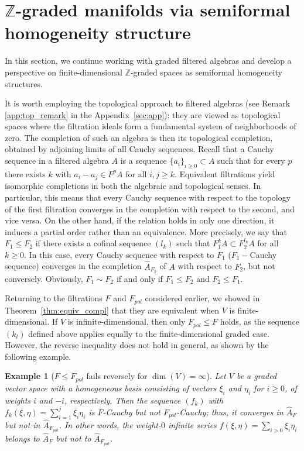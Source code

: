 \documentclass[a4paper,12pt]{amsart}
\newtheorem{example}{Example}
\newcommand{\Z}{{\mathbb Z}}
\begin{document}
\section{$\Z$-graded manifolds via semiformal homogeneity structure}\label{sec:formal_homogeneity}


\noindent In this section, we continue working with graded filtered algebras and develop a perspective on finite-dimensional $\Z$-graded spaces as semiformal homogeneity structures.

\smallskip

\noindent It is worth employing the topological approach to filtered algebras (see Remark \ref{app:top_remark} in the Appendix~\ref{sec:app}): they are viewed as topological spaces where the filtration ideals form a fundamental system of neighborhoods of zero. The completion of such an algebra is then its topological completion, obtained by adjoining limits of all Cauchy sequences. Recall that a Cauchy sequence in a filtered algebra \(A\) is a sequence \(\{a_i\}_{i\ge 0}\subset A\) such that for every \(p\) there exists \(k\) with \(a_i - a_j \in F^p A\) for all \(i,j\ge k\). Equivalent filtrations yield isomorphic completions in both the algebraic and topological senses. In particular, this means that every Cauchy sequence with respect to the topology of the first filtration converges in the completion with respect to the second, and vice versa. On the other hand, if the relation holds in only one direction, it induces a partial order rather than an equivalence. More precisely, we say that $F_1\le F_2$ if there exists a cofinal sequence $(l_k)$ such that $F_1^k A\subset F_2^{l_k}A$ for all $k\ge 0$. In this case, every Cauchy sequence with respect to $F_1$ ($F_1-$Cauchy sequence) converges in the completion $\hat{A}_{F_2}$ of $A$ with respect to $F_2$, but not conversely. Obviously, $F_1\sim F_2$ if and only if $F_1\le F_2$ and $F_2\le F_1$.


\smallskip\noindent Returning to the filtrations \(F\) and \({F_{pol}}\) considered earlier, we showed in Theorem~\ref{thm:equiv_compl} that they are equivalent when \(V\) is finite-dimensional. If \(V\) is infinite-dimensional, then only \({F_{pol}} \le F\) holds, as the sequence \((k_l)\) defined above applies equally to the finite-dimensional graded case. However, the reverse inequality does not hold in general, as shown by the following example.

\begin{example}[$F\le {F_{pol}}$ fails reversely for $\dim (V)=\infty$]\label{ex:connverge}\normalfont
   Let \(V\) be a graded vector space with a homogeneous basis consisting of vectors \(\xi_i\) and \(\eta_i\) for \(i \ge 0\), of weights \(i\) and \(-i\), respectively. Then the sequence \((f_k)\) with \(f_k (\xi,\eta)= \sum_{i=1}^j \xi_i \eta_i\) is \(F\)-Cauchy but not \({F_{pol}}\)-Cauchy; thus, it converges in \(\hat{A}_F\) but not in \(\hat{A}_{{F_{pol}}}\). In other words, the weight-$0$ infinite series $f (\xi,\eta) = \sum_{i>0} \xi_i \eta_i$ belongs to $\hat{A}_F$ but not to $\hat{A}_{{F_{pol}}}$.
\end{example}
\end{document}
